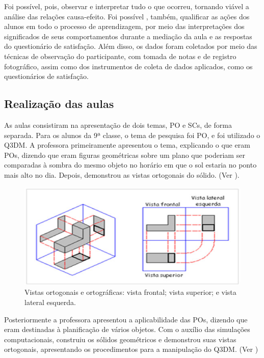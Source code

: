 Foi possível, pois, observar e interpretar tudo o que ocorreu, tornando
viável a análise das relações causa-efeito. Foi possível , também,
qualificar as ações dos alunos em todo o processo de aprendizagem, por
meio das interpretações dos significados de seus comportamentos durante
a mediação da aula e as respostas do questionário de satisfação. Além
disso, os dados foram coletados por meio das técnicas de observação do
participante, com tomada de notas e de registro fotográfico, assim como
dos instrumentos de coleta de dados aplicados, como os questionários de
satisfação.

\subsection{Realização das aulas}\label{sub-sec-Realização das aulas}

As aulas consistiram na apresentação de dois temas, PO e SCs, de forma
separada. Para os alunos da 9ª classe, o tema de pesquisa foi PO, e foi
utilizado o Q3DM. A professora primeiramente apresentou o tema,
explicando o que eram POs, dizendo que eram figuras geométricas sobre um
plano que poderiam ser comparadas à sombra do mesmo objeto no horário em
que o sol estaria no ponto mais alto no dia. Depois, demonstrou as
vistas ortogonais do sólido. (Ver ).

\begin{figure}[htpb]
\centering
\begin{minipage}{.5\textwidth}
\includegraphics[width=\textwidth]{figures/figure03.jpg}
\caption{Vistas ortogonais e ortográficas: vista frontal; vista superior; e vista lateral esquerda.}
\label{fig-03}
\end{minipage}
\end{figure}

Posteriormente a professora apresentou a aplicabilidade das POs, dizendo
que eram destinadas à planificação de vários objetos. Com o auxílio das
simulações computacionais, construiu os sólidos geométricos e demonstrou
suas vistas ortogonais, apresentando os procedimentos para a manipulação
do Q3DM. (Ver )

